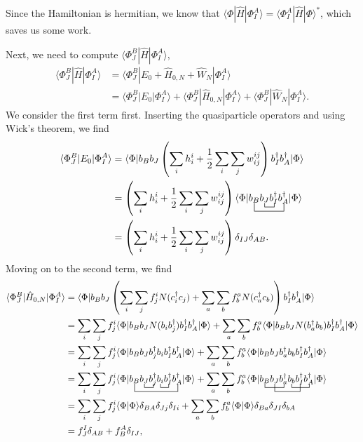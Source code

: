 \documentclass[a4paper]{article}
\newcommand{\nn}{\nonumber}
\begin{document}
Since the Hamiltonian is hermitian, we know that $\langle \Phi | \hat{H} |\Phi^A_I\rangle = \langle \Phi^A_I | \hat{H} |\Phi\rangle^*$, which saves us some work.

Next, we need to compute $\langle \Phi^B_J | \hat{H} | \Phi^A_I \rangle$,
\begin{align}
\langle \Phi^B_J | \hat{H} | \Phi^A_I \rangle &= \langle \Phi^B_J | E_0 + \hat{H}_{0,N} + \hat{W}_N | \Phi^A_I \rangle \nn\\
&= \langle \Phi^B_J | E_0 | \Phi^A_I \rangle + \langle \Phi^B_J | \hat{H}_{0,N} | \Phi^A_I \rangle + \langle \Phi^B_J | \hat{W}_N | \Phi^A_I \rangle. \label{eq:6}
\end{align}
We consider the first term first. Inserting the quasiparticle operators and using Wick's theorem, we find 
\begin{align}
\langle \Phi^B_J | E_0 | \Phi^A_I \rangle &= \langle \Phi |b_Bb_J \left(\sum_i h_i^i + \frac{1}{2}\sum_i \sum_j w^{ij}_{ij}\right) b_I^\dagger b_A^\dagger| \Phi \rangle \nn\\
&= \left(\sum_i h_i^i + \frac{1}{2}\sum_i \sum_j w^{ij}_{ij}\right) \langle \Phi |\bcontraction[2ex]{}{b_B}{b_Jb_I^\dagger}{b_A^\dagger}\bcontraction{b_B}{b_J}{}{b_I^\dagger}b_Bb_J b_I^\dagger b_A^\dagger| \Phi \rangle \nn\\
&= \left(\sum_i h_i^i + \frac{1}{2}\sum_i \sum_j w^{ij}_{ij}\right) \delta_{IJ}\delta_{AB}.
\end{align}
Moving on to the second term, we find
\begin{align}
 \langle \Phi^B_J | \hat{H}_{0,N} | \Phi^A_I \rangle &= \langle \Phi |b_Bb_J \left(\sum_i\sum_j f^i_j N(c_i^\dagger c_j) + \sum_a\sum_b f^a_b N(c_a^\dagger c_b)\right) b_I^\dagger b_A^\dagger| \Phi \rangle \nn\\
 &= \sum_i\sum_j f^i_j\langle \Phi |b_Bb_J  N(b_i b_j^\dagger)b_I^\dagger b_A^\dagger| \Phi \rangle  + \sum_a\sum_b f^a_b\langle \Phi |b_Bb_J N(b_a^\dagger b_b) b_I^\dagger b_A^\dagger| \Phi \rangle \nn\\
 &= \sum_i\sum_j f^i_j \langle \Phi |b_Bb_J b_j^\dagger b_i b_I^\dagger b_A^\dagger| \Phi \rangle  + \sum_a\sum_b f^a_b\langle \Phi |b_Bb_J b_a^\dagger b_b b_I^\dagger b_A^\dagger| \Phi \rangle \nn\\
 &= \sum_i\sum_j f^i_j \langle \Phi |\bcontraction[2ex]{}{b_B}{b_J b_j^\dagger b_i b_I^\dagger}{b_A^\dagger}\bcontraction[1ex]{b_B}{b_J}{}{b_j^\dagger}\bcontraction[1ex]{b_Bb_Jb_j^\dagger}{b_i}{}{b_I^\dagger}b_Bb_J b_j^\dagger b_i b_I^\dagger b_A^\dagger| \Phi \rangle  + \sum_a\sum_b f^a_b\langle \Phi | \bcontraction{}{b_B}{b_J}{b_a^\dagger}\bcontraction[2ex]{b_B}{b_J}{b_a^\dagger b_b}{b_I^\dagger}\bcontraction{b_B b_J b_a^\dagger}{b_b}{b_I^\dagger}{b_A^\dagger}b_Bb_J b_a^\dagger b_b b_I^\dagger b_A^\dagger| \Phi \rangle \nn\\
 &= \sum_i\sum_j f^i_j \langle \Phi| \Phi \rangle\delta_{BA}\delta_{Jj}\delta_{Ii}  + \sum_a\sum_b f^a_b\langle \Phi | \Phi \rangle \delta_{Ba}\delta_{JI}\delta_{bA} \nn\\
 &= f^I_J\delta_{AB} + f^A_B\delta_{IJ},
\end{align}
\end{document}
